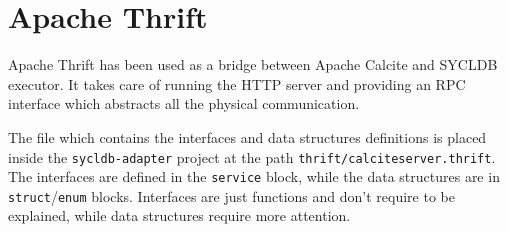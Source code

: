 \documentclass[a4paper, 10pt]{article}
\begin{document}
\section{Apache Thrift}

Apache Thrift has been used as a bridge between Apache Calcite and SYCLDB executor. It takes care of running the HTTP server and providing an RPC interface which abstracts all the physical communication.

The file which contains the interfaces and data structures definitions is placed inside the \texttt{sycldb-adapter} project at the path \texttt{thrift/calciteserver.thrift}. The interfaces are defined in the \texttt{service} block, while the data structures are in \texttt{struct}/\texttt{enum} blocks. Interfaces are just functions and don't require to be explained, while data structures require more attention.
\end{document}
